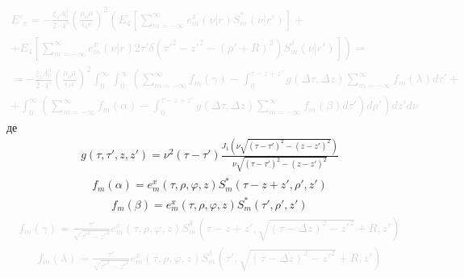 \textcolor{lightgray} { \begin{equation*} \begin{aligned}
E'_x = - \frac{\xi_3 A_0^3}{2 \cdot 4^3} \left(
\frac{\mu_0 \mu} {\epsilon_0 \epsilon} \right)^2
\left( E_4 \left[ \sum_{m=-\infty}^\infty 
e_m^x (\nu | r) S_m^* (\nu | r') \right] \right. + \\
+ \left. E_4 \left[ \sum_{m=-\infty}^\infty 
e_m^x (\nu | r) 2 \tau' \delta \left( {\tau'}^2 - {z'}^2 - (\rho'+R)^2 \right) 
S_m^\delta (\nu | r') \right] \right) = \\
= - \frac{\xi_3 A_0^3}{2 \cdot 4^3} \left(
\frac{\mu_0 \mu} {\epsilon_0 \epsilon} \right)^2
\int_0^\infty \int_0^\infty \left( \sum_{m=-\infty}^\infty f_m (\gamma) - 
\int_0^{\tau - z + z'} g(\Delta \tau, \Delta z)
\sum_{m=-\infty}^\infty f_m (\lambda) d \tau' + \right. \\ 
\left. + \int_0^\infty \left( \sum_{m=-\infty}^\infty f_m (\alpha) - 
\int_0^{\tau - z + z'} g(\Delta \tau, \Delta z)
\sum_{m=-\infty}^\infty f_m (\beta) d \tau' \right) d \rho' \right) dz' d \nu
\end{aligned} \end{equation*} }
%
де
%
\begin{equation*} \begin{aligned}
g(\tau, \tau', z, z') = \nu^2 (\tau - \tau') 
\frac{J_1 \left( \nu \sqrt{(\tau - \tau')^2 - (z - z')^2} \right)}
{\nu \sqrt{(\tau - \tau')^2 - (z - z')^2}}
\end{aligned} \end{equation*}
%
\begin{equation*} \begin{aligned}
f_m (\alpha) = e_m^x (\tau,\rho,\varphi,z) S_m^* (\tau-z+z',\rho',z')
\end{aligned} \end{equation*}
%
\begin{equation*} \begin{aligned}
f_m (\beta) = e_m^x (\tau,\rho,\varphi,z) S_m^* (\tau',\rho',z')
\end{aligned} \end{equation*}
%
\textcolor{lightgray} { \begin{equation*} \begin{aligned}
f_m (\gamma) = \frac{\tau'}{\sqrt{{\tau'}^2 - {z'}^2}} 
e_m^x (\tau,\rho,\varphi,z) S_m^\delta 
\left( \tau-z+z',\sqrt{(\tau-\Delta z)^2 - {z'}^2}+R,z' \right)
\end{aligned} \end{equation*} }
%
\textcolor{lightgray} { \begin{equation*} \begin{aligned}
f_m (\lambda) = \frac{\tau'}{\sqrt{{\tau'}^2 - {z'}^2}}
e_m^x (\tau,\rho,\varphi,z) S_m^\delta 
\left( \tau',\sqrt{(\tau-\Delta z)^2 - {z'}^2}+R,z' \right)
\end{aligned} \end{equation*} }


